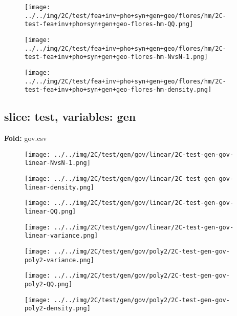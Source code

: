 \begin{figure}[H]
\centering	\texttt{[image: ../../img/2C/test/fea+inv+pho+syn+gen+geo/flores/hm/2C-test-fea+inv+pho+syn+gen+geo-flores-hm-QQ.png]}
\end{figure}
\begin{figure}[H]
\centering	\texttt{[image: ../../img/2C/test/fea+inv+pho+syn+gen+geo/flores/hm/2C-test-fea+inv+pho+syn+gen+geo-flores-hm-NvsN-1.png]}
\end{figure}
\begin{figure}[H]
\centering	\texttt{[image: ../../img/2C/test/fea+inv+pho+syn+gen+geo/flores/hm/2C-test-fea+inv+pho+syn+gen+geo-flores-hm-density.png]}
\end{figure}
\subsection{slice: test, variables: gen}
\textbf{Fold:} gov.csv
\begin{figure}[H]
\centering	\texttt{[image: ../../img/2C/test/gen/gov/linear/2C-test-gen-gov-linear-NvsN-1.png]}
\end{figure}
\begin{figure}[H]
\centering	\texttt{[image: ../../img/2C/test/gen/gov/linear/2C-test-gen-gov-linear-density.png]}
\end{figure}
\begin{figure}[H]
\centering	\texttt{[image: ../../img/2C/test/gen/gov/linear/2C-test-gen-gov-linear-QQ.png]}
\end{figure}
\begin{figure}[H]
\centering	\texttt{[image: ../../img/2C/test/gen/gov/linear/2C-test-gen-gov-linear-variance.png]}
\end{figure}
\begin{figure}[H]
\centering	\texttt{[image: ../../img/2C/test/gen/gov/poly2/2C-test-gen-gov-poly2-variance.png]}
\end{figure}
\begin{figure}[H]
\centering	\texttt{[image: ../../img/2C/test/gen/gov/poly2/2C-test-gen-gov-poly2-QQ.png]}
\end{figure}
\begin{figure}[H]
\centering	\texttt{[image: ../../img/2C/test/gen/gov/poly2/2C-test-gen-gov-poly2-density.png]}
\end{figure}
